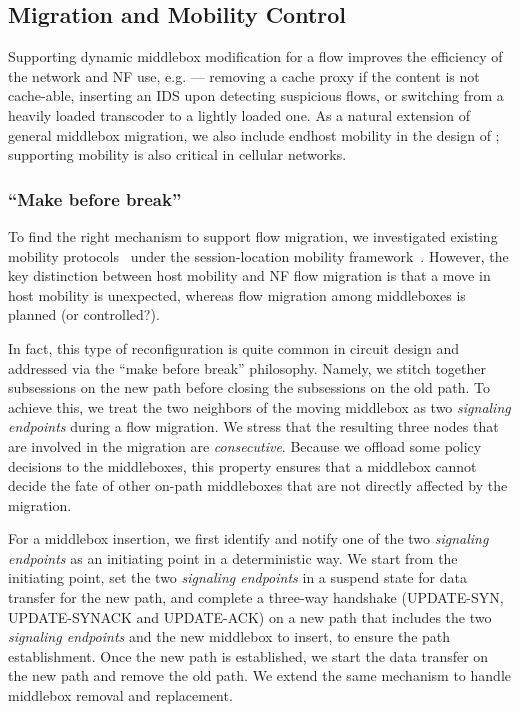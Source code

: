 \subsection{Migration and Mobility Control}\label{MigrateLogic}

Supporting dynamic middlebox modification for a flow improves the efficiency of the network and NF use, e.g. --- removing a cache proxy if the content is not cache-able, inserting an IDS upon detecting suspicious flows, or switching from a heavily loaded transcoder to a lightly loaded one. As a natural extension of general middlebox migration, we also include endhost mobility in the design of \system; supporting mobility is also critical in cellular networks.

\subsubsection{``Make before break''} \label{migration1}
To find the right mechanism to support flow migration, we investigated existing mobility protocols~\cite{TCPMobile, I3Mobile, mip, serval, lisp, hip} under the session-location mobility framework~\cite{zave}. However, the key distinction between host mobility and NF flow migration is that a move in host mobility is unexpected, whereas flow migration among middleboxes is planned (or controlled?). 

In fact, this type of reconfiguration is quite common in circuit design and addressed via the ``make before break'' philosophy. Namely, we stitch together subsessions on the new path before closing the subsessions on the old path. To achieve this, we treat the two neighbors of the moving middlebox as two \textit{signaling endpoints} during a flow migration. We stress that the resulting three nodes that are involved in the migration are \textit{consecutive}. Because we offload some policy decisions to the middleboxes, this property ensures that a middlebox cannot decide the fate of other on-path middleboxes that are not directly affected by the migration. 

For a middlebox insertion, we first identify and notify one of the two \textit{signaling endpoints} as an initiating point in a deterministic way. We start from the initiating point, set the two \textit{signaling endpoints} in a suspend state for data transfer for the new path, and complete a three-way handshake (UPDATE-SYN, UPDATE-SYNACK and UPDATE-ACK) on a new path that includes the two \textit{signaling endpoints} and the new middlebox to insert, to ensure the path establishment. Once the new path is established, we start the data transfer on the new path and remove the old path. We extend the same mechanism to handle middlebox removal and replacement. 

